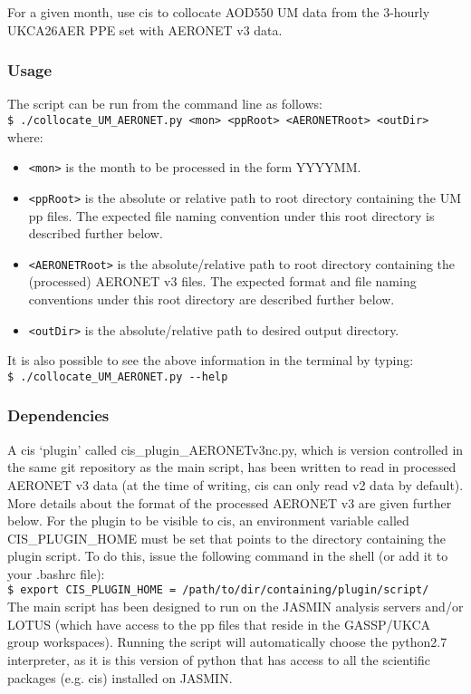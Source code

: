\documentclass[10pt,a4paper]{article}
\newcommand\tab[1][0.5cm]{\hspace*{#1}}
\begin{document}
For a given month, use cis to collocate AOD550 UM data from the 3-hourly UKCA26AER PPE set with
         AERONET v3 data.

\subsubsection{Usage}
The script can be run from the command line as follows:\\
\tab \texttt{\$ ./collocate\_UM\_AERONET.py <mon> <ppRoot> <AERONETRoot> <outDir>}\\
where:
\begin{itemize}
\item \texttt{<mon>} is the month to be processed in the form YYYYMM.
\item \texttt{<ppRoot>} is the absolute or relative path to root directory containing the UM pp files. The expected file naming convention under this root directory is described further below.
\item \texttt{<AERONETRoot>} is the absolute/relative path to root directory containing the (processed) AERONET v3 files. The expected format and file naming conventions under this root directory are described further below.
\item \texttt{<outDir>} is the absolute/relative path to desired output directory.
\end{itemize}
It is also possible to see the above information in the terminal by typing:\\
\tab \texttt{\$ ./collocate\_UM\_AERONET.py -{}-help}

\subsubsection{Dependencies}
A cis `plugin' called cis\_plugin\_AERONETv3nc.py, which is version controlled in the same git repository as the main script, has been written to read in processed AERONET v3 data (at the time of writing, cis can only read v2 data by default). More details about the format of the processed AERONET v3 are given further below. For the plugin to be visible to cis, an environment variable called CIS\_PLUGIN\_HOME must be set that points to the directory containing the plugin script. To do this, issue the following command in the shell (or add it to your .bashrc file):\\
\tab \texttt{\$ export CIS\_PLUGIN\_HOME = /path/to/dir/containing/plugin/script/}\\

\noindent The main script has been designed to run on the JASMIN analysis servers and/or LOTUS (which have access to the pp files that reside in the GASSP/UKCA group workspaces). Running the script will automatically choose the python2.7 interpreter, as it is this version of python that has access to all the scientific packages (e.g. cis) installed on JASMIN.\\
\end{document}
